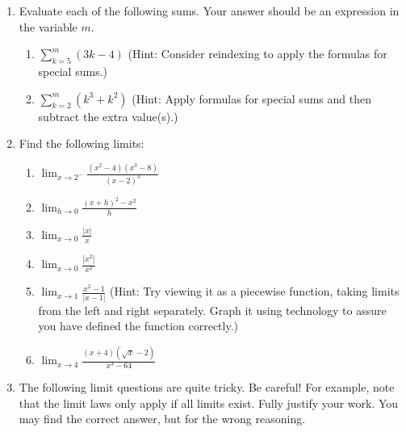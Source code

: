 \documentclass{article}
\begin{document}
\begin{enumerate}
                        \item Evaluate each of the following sums.  Your answer should be an expression in the variable $m$.
                            \begin{enumerate}
                                \item $ \sum_{k=5}^{m} (3k-4)$  (Hint: Consider reindexing to apply the formulas for special sums.)
                                \item $ \sum_{k=2}^{m} (k^3+k^2)$  (Hint: Apply formulas for special sums and then subtract the extra value(s).)
                            \end{enumerate}
                        \item Find the following limits:
                        \begin{enumerate}
                            \item   $ \lim_{x \rightarrow 2^-} \frac{(x^2-4)(x^3-8)}{(x-2)^3}$
                            \item  $ \lim_{h\rightarrow 0} \frac{(x+h)^2-x^2}{h}$
                            \item $ \lim_{x\rightarrow 0} \frac{\left|x\right|}{x}$
                            \item $ \lim_{x\rightarrow 0} \frac{\left|x^2\right|}{x^2}$
                            \item $ \lim_{x \rightarrow 1} \frac{x^2-1}{|x-1|}$ (Hint: Try viewing it as a piecewise function, taking limits from the left and right separately. Graph it using technology to assure you have defined the function correctly.)
                            \item $ \lim_{x \rightarrow 4} \frac{(x+4)(\sqrt{x}-2)}{x^3-64}$
                        \end{enumerate}
                        \item The following limit questions are quite tricky. Be careful! For example, note that the limit laws only apply if all limits exist. Fully justify your work. You may find the correct answer, but for the wrong reasoning.
    

\end{enumerate}
\end{document}
